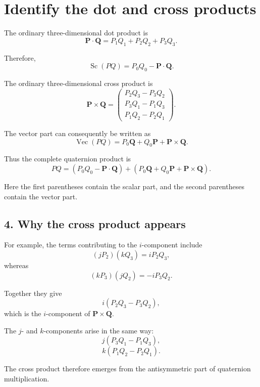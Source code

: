 \chapter{Identify the dot and cross products}

The ordinary three-dimensional dot product is
\[
\mathbf P\cdot\mathbf Q
=P_1Q_1+P_2Q_2+P_3Q_3.
\]

Therefore,
\[
\operatorname{Sc}(PQ)
=P_0Q_0-\mathbf P\cdot\mathbf Q.
\]

The ordinary three-dimensional cross product is
\[
\mathbf P\times\mathbf Q
=
\begin{pmatrix}
P_2Q_3-P_3Q_2\\
P_3Q_1-P_1Q_3\\
P_1Q_2-P_2Q_1
\end{pmatrix}.
\]

The vector part can consequently be written as
\[
\operatorname{Vec}(PQ)
=P_0\mathbf Q+Q_0\mathbf P+\mathbf P\times\mathbf Q.
\]

Thus the complete quaternion product is
\[
\boxed{
PQ=
\left(P_0Q_0-\mathbf P\cdot\mathbf Q\right)
+
\left(P_0\mathbf Q+Q_0\mathbf P+\mathbf P\times\mathbf Q\right)
}.
\]

Here the first parentheses contain the scalar part, and the second parentheses contain the vector part.

\section*{4. Why the cross product appears}

For example, the terms contributing to the \(i\)-component include
\[
(jP_2)(kQ_3)=iP_2Q_3,
\]
whereas
\[
(kP_3)(jQ_2)=-iP_3Q_2.
\]

Together they give
\[
i(P_2Q_3-P_3Q_2),
\]
which is the \(i\)-component of
\(\mathbf P\times\mathbf Q\).

The \(j\)- and \(k\)-components arise in the same way:
\[
j(P_3Q_1-P_1Q_3),
\]
\[
k(P_1Q_2-P_2Q_1).
\]

The cross product therefore emerges from the antisymmetric part of quaternion multiplication.
